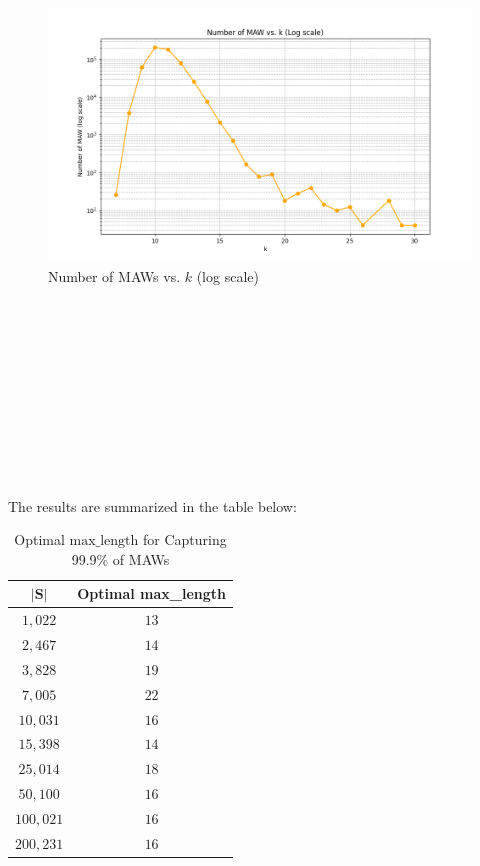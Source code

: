 \documentclass[conference]{IEEEtran}
\begin{document}
\begin{figure}[htbp]
\centerline{\includegraphics[scale=0.30]{number of MAW vs k (log scale).png}}
\caption{Number of MAWs vs. $k$ (log scale)}
\label{fig}
\end{figure}
$\quad$\\
\\
\\
\\
\\
\\
\\
\\
\\
\\


The results are summarized in the table below:

\begin{table}[htbp]
\caption{Optimal $\text{max\_length}$ for Capturing 99.9\% of MAWs}
\begin{center}
\begin{tabular}{|c|c|}
\hline
$\mathbf{|S|}$ & \textbf{Optimal max\_length} \\
\hline
$1,022$ & $13$\\
\hline
$2,467$ & $14$\\
\hline
$3,828$ & $19$\\
\hline
$7,005$ & $22$\\
\hline
$10,031$ & $16$\\
\hline
$15,398$ & $14$\\
\hline
$25,014$ & $18$\\
\hline
$50,100$ & $16$\\
\hline
$100,021$ & $16$\\
\hline
$200,231$ & $16$\\
\hline
\end{tabular}
\end{center}
\end{table}
\end{document}
